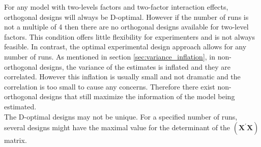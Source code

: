 For any model with two-levels factors and two-factor interaction effects, orthogonal designs will always be D-optimal. However if the number of runs is not a multiple of 4 then there are no orthogonal designs available for two-level factors. This condition offers little flexibility for experimenters and is not always feasible. In contrast, the optimal experimental design approach allows for any number of runs. As mentioned in section \ref{sec:variance_inflation}, in non-orthogonal designs, the variance of the estimates is inflated and they are correlated. However this inflation is usually small and not dramatic and the correlation is too small to cause any concerns. Therefore there exist non-orthogonal designs that still maximize the information of the model being estimated.\\
The D-optimal designs may not be unique. For a specified number of runs, several designs might have the maximal value for the determinant of the $(\mathbf{X}^{\prime}\mathbf{X})$ matrix.\\


